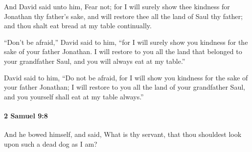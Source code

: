 			\begin{versebox}
					\item[BHS] 
					\item[ASV] And David said unto him, Fear not; for I will surely show thee kindness for Jonathan thy father's sake, and will restore thee all the land of Saul thy father; and thou shalt eat bread at my table continually.
					\item[NIV] “Don’t be afraid,” David said to him, “for I will surely show you kindness for the sake of your father Jonathan. I will restore to you all the land that belonged to your grandfather Saul, and you will always eat at my table.”
					\item[NRSV] David said to him, “Do not be afraid, for I will show you kindness for the sake of your father Jonathan; I will restore to you all the land of your grandfather Saul, and you yourself shall eat at my table always.”
			\end{versebox}

		\paragraph{2 Samuel 9:8} %
			\label{2SAMUEL-9-8}

			And he bowed himself, and said, What is thy servant, that thou shouldest look upon such a dead dog as I am?

